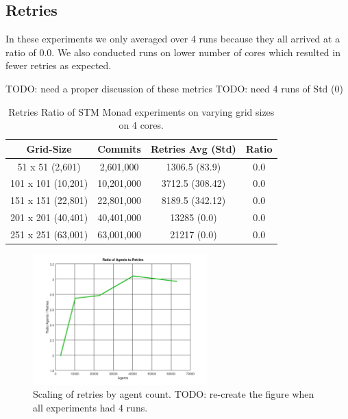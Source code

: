 
\subsection{Retries}
In these experiments we only averaged over 4 runs because they all arrived at a ratio of 0.0. We also conducted runs on lower number of cores which resulted in fewer retries as expected. 

TODO: need a proper discussion of these metrics
TODO: need 4 runs of Std (0)

\begin{table}
	\centering
  	\begin{tabular}{ c || c | c | c  }
        Grid-Size 		   & Commits    & Retries Avg (Std) & Ratio \\ \hline \hline 
   		51 x 51 (2,601)    & 2,601,000  & 1306.5 (83.9)     & 0.0 \\ \hline
   		101 x 101 (10,201) & 10,201,000 & 3712.5 (308.42)   & 0.0 \\ \hline
   		151 x 151 (22,801) & 22,801,000 & 8189.5 (342.12)   & 0.0 \\ \hline
   		201 x 201 (40,401) & 40,401,000 & 13285 (0.0)       & 0.0 \\ \hline 
   		251 x 251 (63,001) & 63,001,000 & 21217 (0.0)       & 0.0 \\ \hline
  	\end{tabular}
  	
  	\caption{Retries Ratio of STM Monad experiments on varying grid sizes on 4 cores.}
	\label{tab:retries_stm}
\end{table}

\begin{figure}
	\centering
	\includegraphics[width=0.6\textwidth, angle=0]{./fig/sir/retries_stm.png}
	\caption{Scaling of retries by agent count. TODO: re-create the figure when all experiments had 4 runs.}
	\label{fig:retries_stm}
\end{figure}


